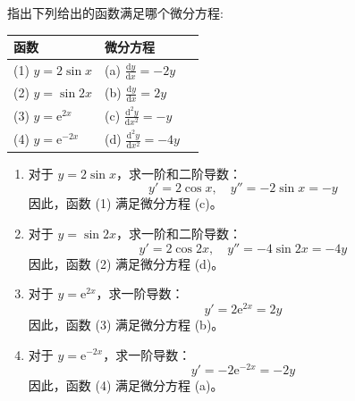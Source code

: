 \documentclass[lang=cn,11pt]{elegantbook}
\begin{document}
\begin{exercise}[函数对应微分方程]
指出下列给出的函数满足哪个微分方程:
\begin{center}
\begin{tabular}{@{}lll@{}}
\toprule
 \textbf{函数} & \textbf{微分方程} \\
\midrule
(1)  $y=2\sin x$ & (a) $\displaystyle \frac{\mathrm{d}y}{\mathrm{d}x}=-2y$ \\[6pt]
(2) $y=\sin2x$ & (b) $\displaystyle \frac{\mathrm{d}y}{\mathrm{d}x}=2y$ \\[6pt]
(3)  $y=\mathrm{e}^{2x}$ & (c) $\displaystyle \frac{\mathrm{d}^2y}{\mathrm{d}x^2}=-y$ \\[6pt]
(4)  $y=\mathrm{e}^{-2x}$ & (d) $\displaystyle \frac{\mathrm{d}^2y}{\mathrm{d}x^2}=-4y$ \\
\bottomrule
\end{tabular}
\end{center}
\end{exercise}
\begin{solution}
\begin{enumerate}
    \item[(1)] 对于 $y=2\sin x$，求一阶和二阶导数：
    \[
    y' = 2\cos x, \quad y'' = -2\sin x = -y
    \]
    因此，函数 (1) 满足微分方程 (c)。
    \item[(2)] 对于 $y=\sin 2x$，求一阶和二阶导数：
    \[
    y' = 2\cos 2x, \quad y'' = -4\sin 2x = -4y
    \]
    因此，函数 (2) 满足微分方程 (d)。
    \item[(3)] 对于 $y=\mathrm{e}^{2x}$，求一阶导数：
    \[
    y' = 2\mathrm{e}^{2x} = 2y
    \]
    因此，函数 (3) 满足微分方程 (b)。
    \item[(4)] 对于 $y=\mathrm{e}^{-2x}$，求一阶导数：
    \[
    y' = -2\mathrm{e}^{-2x} = -2y
    \]
    因此，函数 (4) 满足微分方程 (a)。
\end{enumerate}
\end{solution}
\end{document}
